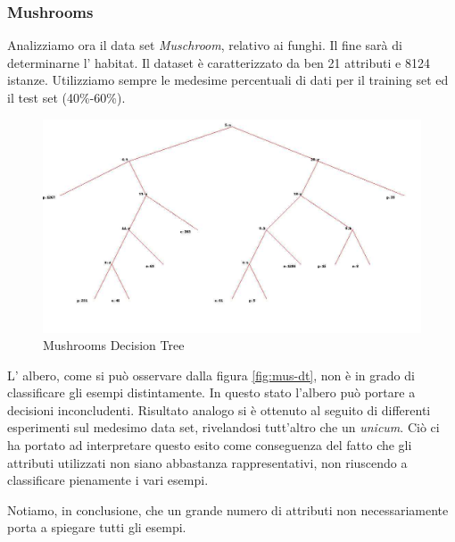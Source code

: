 		\subsubsection{Mushrooms} 
			Analizziamo ora il data set \emph{Muschroom}, relativo ai funghi. Il fine sarà di determinarne l' habitat. Il dataset è caratterizzato da ben 21 attributi e 8124 istanze. Utilizziamo sempre le medesime percentuali di dati per il training set ed il test set (40\%-60\%).
			
			\begin{figure}
				\includegraphics[width=1.2\textwidth, height=0.9\textheight]{mushroom.jpg}
				\caption{Mushrooms Decision Tree}
				\label{fig:mus-dt}
			\end{figure}
			
					
			L' albero, come si può osservare dalla figura \vref{fig:mus-dt}, non è in grado di classificare gli esempi distintamente. In questo stato l'albero può portare a decisioni inconcludenti. Risultato analogo si è ottenuto al seguito di differenti esperimenti sul medesimo data set, rivelandosi tutt'altro che un \textit{unicum}. Ciò ci ha portato ad interpretare questo esito come conseguenza del fatto che gli attributi utilizzati non siano abbastanza rappresentativi, non riuscendo a classificare pienamente i vari esempi.
			
		    
			Notiamo, in conclusione, che un grande numero di attributi non necessariamente porta a spiegare tutti gli esempi.
		\newpage
